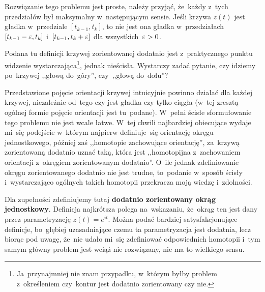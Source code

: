 \documentclass[a4paper,11pt]{article}
\begin{document}
Rozwiązanie tego problemu jest proste, należy przyjąć, że~każdy z~tych
przedziałów był maksymalny w~następującym sensie. Jeśli krzywa
$z( t )$ jest gładka w~przedziale $[ t_{ k - 1 }, t_{ k } ]$, to nie
jest ona gładka w~przedziałach $[ t_{ k - 1 } - \varepsilon, t_{ k } ]$
i~$[ t_{ k - 1 }, t_{ k } + \varepsilon ]$ dla wszystkich~$\varepsilon > 0$.

\vspace{\spaceFour}


\start {} Podana tu definicji krzywej zorientowanej dodatnio
jest z~praktycznego punktu widzenie
wystarczająca\footnote{Ja~przynajmniej nie znam przypadku, w~którym
  byłby problem z~określeniem czy~kontur jest dodatnio zorientowany
  czy nie.}, jednak nieścisła. Wystarczy zadać pytanie, czy idziemy
po~krzywej ,,głową do~góry'', czy~,,głową do~dołu''?

Przedstawione pojęcie orientacji krzywej intuicyjnie powinno działać
dla każdej krzywej, niezależnie od~tego czy jest gładka czy tylko
ciągła (w~tej zresztą ogólnej formie pojęcie orientacji jest
tu~podane). W~pełni ścisłe sformułowanie tego problemu nie jest wcale
łatwe. W~tej chwili najbardziej obiecujące wydaje mi~się podejście
w~którym najpierw definiuje~się orientację okręgu jednostkowego,
później zaś ,,homotopie zachowujące orientację'', za~krzywą
zorientowaną dodatnio uznać taką, która jest ,,homotopijna
z~zachowaniem orientacji z~okręgiem zorientowanym dodatnio''. O~ile
jednak zdefiniowanie okręgu zorientowanego dodatnio nie jest trudne,
to~podanie w~sposób ścisły i~wystarczająco ogólnych takich homotopii
przekracza moją wiedzę i~zdolności.

Dla zupełności zdefiniujemy tutaj \textbf{dodatnio zorientowany okrąg
  jednostkowy}. Definicja najkrótsza polega na~wskazaniu, że~okrąg ten
jest dany przez parametryzację $z( t ) = e^{ i t }$. Można podać
bardziej satysfakcjonujące definicje, bo~głębiej uzasadniające czemu
ta parametryzacja jest dodatnia, lecz biorąc pod uwagę, że~nie udało
mi~się zdefiniować odpowiednich homotopii i~tym samym główny problem
jest wciąż nie rozwiązany, nie ma to wielkiego sensu.

\vspace{\spaceFour}
\end{document}
